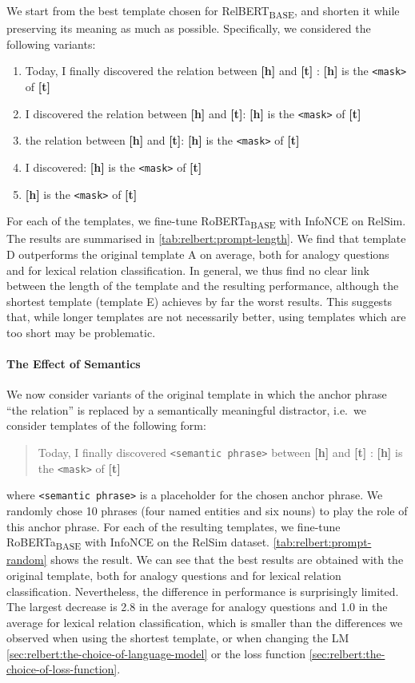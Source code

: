 \documentclass[3p]{elsarticle}
\begin{document}
{We start from the best template chosen for RelBERT\textsubscript{BASE}, and shorten it while preserving its meaning as much as possible. Specifically, we considered the following variants:
\begin{enumerate}[label=\Alph*.]
    \item Today, I finally discovered the relation between \textbf{[h]} and \textbf{[t]} : \textbf{[h]} is the \texttt{<mask>} of \textbf{[t]}
    \item I discovered the relation between \textbf{[h]} and \textbf{[t]}: \textbf{[h]} is the \texttt{<mask>} of \textbf{[t]}	
    \item the relation between \textbf{[h]} and \textbf{[t]}: \textbf{[h]} is the \texttt{<mask>} of \textbf{[t]}
    \item I discovered: \textbf{[h]} is the \texttt{<mask>} of \textbf{[t]}
    \item \textbf{[h]} is the \texttt{<mask>} of \textbf{[t]}
\end{enumerate}
For each of the templates, we fine-tune RoBERTa\textsubscript{BASE} with InfoNCE on RelSim.  The results are summarised in \autoref{tab:relbert:prompt-length}. We find that template D outperforms the original template A on average, both for analogy questions and for lexical relation classification. In general, we thus find no clear link between the length of the template and the resulting performance, although the shortest template (template E) achieves by far the worst results. This suggests that, while longer templates are not necessarily better, using templates which are too short may be problematic.

\paragraph{The Effect of Semantics} 
We now consider variants of the original template in which the anchor phrase ``the relation'' is replaced by a semantically meaningful distractor, i.e.\ we consider templates of the following form:
\begin{quote}
Today, I finally discovered \texttt{<semantic phrase>} between \textbf{[h]} and \textbf{[t]} : \textbf{[h]} is the \texttt{<mask>} of \textbf{[t]}    
\end{quote}
where \texttt{<semantic phrase>} is a placeholder for the chosen anchor phrase. We randomly chose 10 phrases (four named entities and six nouns) to play the role of this anchor phrase. For each of the resulting templates, we fine-tune RoBERTa\textsubscript{BASE} with InfoNCE on the RelSim dataset.
\autoref{tab:relbert:prompt-random} shows the result. We can see that the best results are obtained with the original template, both for analogy questions and for lexical relation classification. Nevertheless, the difference in performance is surprisingly limited.
The largest decrease is 2.8 in the average for analogy questions and 1.0 in the average for lexical relation classification, which is smaller than the differences we observed when using the shortest template, or when changing the LM \autoref{sec:relbert:the-choice-of-language-model} or the loss function \autoref{sec:relbert:the-choice-of-loss-function}.

}
\end{document}
